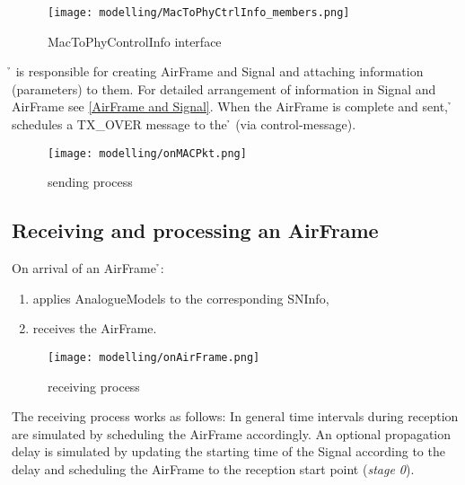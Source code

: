 \begin{figure}[H]
 \centering
 \texttt{[image: modelling/MacToPhyCtrlInfo\_members.png]}
 \caption{MacToPhyControlInfo interface}
 \label{fig: MacToPhyCtrlInfo interface}
\end{figure}

\h{\bp} is responsible for creating AirFrame and Signal and attaching information (parameters) to them. For detailed arrangement of information in Signal and AirFrame see \ref{AirFrame and Signal}.
When the AirFrame is complete and sent, \h{\bp} schedules a TX\_OVER message to the \h{\bm} (via control-message).

\begin{figure}[H]
 \centering
 \texttt{[image: modelling/onMACPkt.png]}
 \caption{sending process}
 \label{fig: sending process}
\end{figure}





\subsection{Receiving and processing an AirFrame}

On arrival of an AirFrame \h{\bp}:
\begin{enumerate}
	
	\item applies AnalogueModels to the corresponding SNInfo,
	\item receives the AirFrame.
\end{enumerate}

\begin{figure}[H]
 \centering
 \texttt{[image: modelling/onAirFrame.png]}
 \caption{receiving process}
 \label{fig: receiving process}
\end{figure}


The receiving process works as follows: In general time intervals during reception are simulated by scheduling the AirFrame accordingly.
An optional propagation delay is simulated by updating the starting time of the Signal according to the delay and scheduling the AirFrame to the reception start point (\textit{stage 0}).\\

